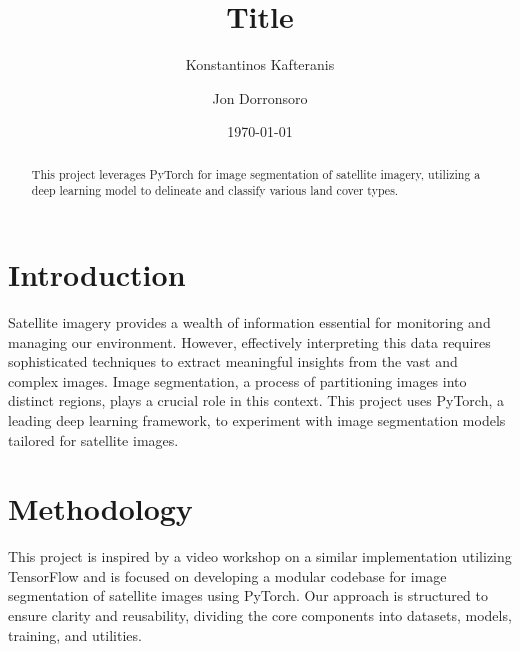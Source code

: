 \documentclass{article}
\title{Title}
\author{Konstantinos Kafteranis \and Jon Dorronsoro}
\date{\today}
\begin{document}

\begin{abstract}
    This project leverages PyTorch for image segmentation of satellite imagery, utilizing a deep learning model to delineate and classify various land cover types. 
\end{abstract}

\section{Introduction}
Satellite imagery provides a wealth of information essential for monitoring and managing our environment. However, effectively interpreting this data requires sophisticated techniques to extract meaningful insights from the vast and complex images. Image segmentation, a process of partitioning images into distinct regions, plays a crucial role in this context. This project uses PyTorch, a leading deep learning framework, to experiment with image segmentation models tailored for satellite images.

\section{Methodology}
This project is inspired by a video workshop on a similar implementation utilizing TensorFlow and is focused on developing a modular codebase for image segmentation of satellite images using PyTorch. Our approach is structured to ensure clarity and reusability, dividing the core components into datasets, models, training, and utilities.
\end{document}
